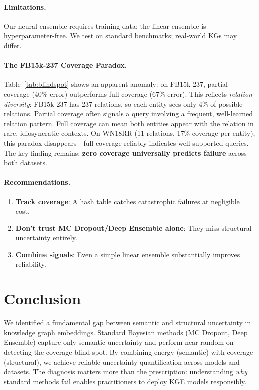 \documentclass{article}
\begin{document}
\paragraph{Limitations.}
Our neural ensemble requires training data; the linear ensemble is hyperparameter-free.
We test on standard benchmarks; real-world KGs may differ.

\paragraph{The FB15k-237 Coverage Paradox.}
Table~\ref{tab:blindspot} shows an apparent anomaly: on FB15k-237, partial coverage (40\% error) outperforms full coverage (67\% error).
This reflects \emph{relation diversity}: FB15k-237 has 237 relations, so each entity sees only 4\% of possible relations.
Partial coverage often signals a query involving a frequent, well-learned relation pattern.
Full coverage can mean both entities appear with the relation in rare, idiosyncratic contexts.
On WN18RR (11 relations, 17\% coverage per entity), this paradox disappears---full coverage reliably indicates well-supported queries.
The key finding remains: \textbf{zero coverage universally predicts failure} across both datasets.

\paragraph{Recommendations.}
\begin{enumerate}
    \item \textbf{Track coverage}: A hash table catches catastrophic failures at negligible cost.
    \item \textbf{Don't trust MC Dropout/Deep Ensemble alone}: They miss structural uncertainty entirely.
    \item \textbf{Combine signals}: Even a simple linear ensemble substantially improves reliability.
\end{enumerate}

\section{Conclusion}

We identified a fundamental gap between semantic and structural uncertainty in knowledge graph embeddings.
Standard Bayesian methods (MC Dropout, Deep Ensemble) capture only semantic uncertainty and perform near random on detecting the coverage blind spot.
By combining energy (semantic) with coverage (structural), we achieve reliable uncertainty quantification across models and datasets.
The diagnosis matters more than the prescription: understanding \emph{why} standard methods fail enables practitioners to deploy KGE models responsibly.



\end{document}
